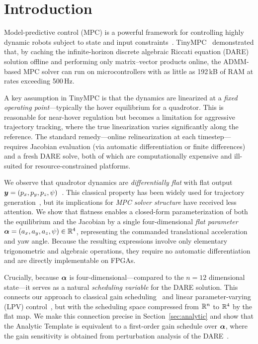 \section{Introduction}\label{sec:intro}

Model-predictive control (MPC) is a powerful framework for controlling
highly dynamic robots subject to state and input constraints~\cite{tinympc}.
TinyMPC~\cite{tinympc} demonstrated that, by caching the
infinite-horizon discrete algebraic Riccati equation (DARE) solution
offline and performing only matrix--vector products online,
the ADMM-based MPC solver can run on microcontrollers with as little
as 192\,kB of RAM at rates exceeding 500\,Hz.

A key assumption in TinyMPC is that the dynamics are linearized
at a \emph{fixed operating point}---typically the hover equilibrium
for a quadrotor.
This is reasonable for near-hover regulation but becomes a limitation
for aggressive trajectory tracking, where the true linearization
varies significantly along the reference.
The standard remedy---online relinearization at each timestep---requires
Jacobian evaluation (via automatic differentiation or finite differences)
and a fresh DARE solve, both of which are computationally expensive
and ill-suited for resource-constrained platforms.

We observe that quadrotor dynamics are \emph{differentially flat}
with flat output $\bm{y} = (p_x, p_y, p_z, \psi)$~\cite{mellinger2011,murray1995}.
This classical property has been widely used for trajectory
generation~\cite{mellinger2011,mueller2015}, but its implications
for \emph{MPC solver structure} have received less attention.
We show that flatness enables a closed-form parameterization of
both the equilibrium and the Jacobian by a single four-dimensional
\emph{flat parameter}
$\bm{\alpha} = (a_x, a_y, a_z, \psi) \in \mathbb{R}^4$,
representing the commanded translational acceleration and yaw angle.
Because the resulting expressions involve only elementary trigonometric
and algebraic operations, they require no automatic differentiation
and are directly implementable on FPGAs.

Crucially, because $\bm{\alpha}$ is four-dimensional---compared to the
$n=12$ dimensional state---it serves as a natural
\emph{scheduling variable} for the DARE solution.
This connects our approach to classical gain scheduling~\cite{rugh2000}
and linear parameter-varying (LPV) control~\cite{shamma1991},
but with the scheduling space compressed from $\mathbb{R}^n$ to $\mathbb{R}^4$
by the flat map.
We make this connection precise in Section~\ref{sec:analytic}
and show that the Analytic Template is equivalent to
a first-order gain schedule over $\bm{\alpha}$, where the gain
sensitivity is obtained from perturbation analysis of the
DARE~\cite{hewer1971,konstantinov1993}.

